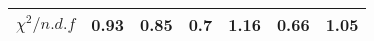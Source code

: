 \begin{table}[H]
{{\begin{tabular}{lrrrrrr}
\rule{0pt}{4ex}$\chi^2 / n.d.f$ & 0.93 & 0.85 & 0.7 & 1.16 & 0.66 & 1.05\\
\bottomrule
\end{tabular}
} %

} %
\label{tab:chib:ups1s:fits}
\end{table}
